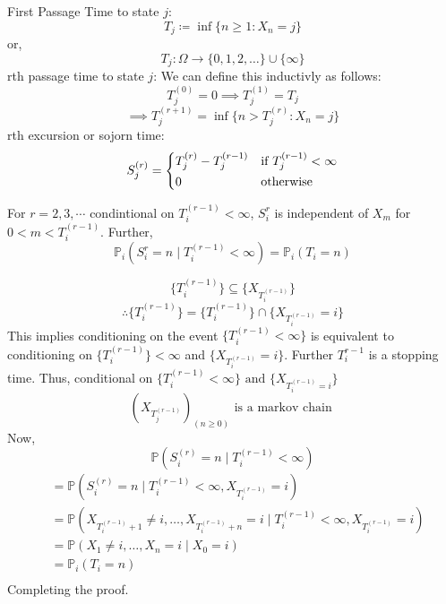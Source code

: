 \begin{definition}
    First Passage Time to state \(j\):
    \[
        T_j \coloneqq  \inf \{n \geq 1 : X_n = j\}
    \]
    or,
    \[
        T_j : \Omega \to \{0,1,2,\dots \} \cup \{\infty\}
    \]
    rth passage time to state \(j\): We can define this inductivly as follows:
    \[
        T_j^{(0)} = 0 \implies T_j^{(1)} = T_j
    \]
    \[
        \implies T_j^{(r+1)} = \inf \{n > T_j^{(r)} : X_n = j\}
    \]
    rth excursion or sojorn time:
    \[
        S_j^{(r)} = \begin{dcases}
            T_j^{(r)} - T_j^{(r-1)} & \text{if } T_j^{(r-1)} < \infty \\
            0 & \text{otherwise}
        \end{dcases}
    \]
\end{definition}
\begin{lemma} 
    For \( r = 2,3,\cdots \) condintional on \(T_i^{(r-1)} < \infty \), \(S_i^r\) is independent
    of \(X_m\) for \(0 < m < T_i^{(r-1)}\). Further,
    \[
        \mathbb{P}_i (S_i^r = n \mid T_i^{(r-1)} < \infty) = \mathbb{P}_i(T_i = n)  
    \]
\end{lemma}
\begin{lemmaproof}
    \[
        \{T_i^{(r-1)}\} \subseteq \{X_{T_i^{(r-1)}}\}
    \]
    \[
        \therefore \{T_i^{(r-1)}\} = \{T_i^{(r-1)}\} \cap \{X_{T_i^{(r-1)}} = i\}
    \]
    This implies conditioning on the event \(\{T_i ^{(r-1)} < \infty \} \) is equivalent
    to conditioning on \(\{T_i^{(r-1)}\} < \infty \) and \( \{X_{T_i^{(r-1)}} = i\} \). Further
    \(T_i^{r-1}\) is a stopping time. Thus, conditional on \(\{T_i^{(r-1)} < \infty\} \text{ and } \{
        X_{T_i^{(r-1)} = i}\} \)
    \[
        {\left( 
            X_{T_j^{(r-1)}}
         \right)}_{(n \geq 0)} \text{ is a markov chain } 
    \]
    Now,
    \[
        \mathbb{P} (
            S_i^{(r)} = n \mid T_i^{(r-1)} < \infty
            ) 
    \]
    \[
        \begin{aligned}
                &= \mathbb{P} (S_i^{(r)} = n \mid T_i^{(r-1)} < \infty, X_{T_i^{(r-1)}} = i) \\
                &= \mathbb{P} (
                    X_{T_i^{(r-1)} + 1} \neq i, \dots , X_{T_i^{(r-1)} + n} = i 
                \mid T_i^{(r-1)} < \infty, X_{T_i^{(r-1)}} = i) \\
                &= \mathbb{P} (
                    X_1 \neq i, \dots , X_n = i \mid X_0 = i
                ) \\
                &= \mathbb{P}_i (T_i = n) \\
            \end{aligned}
    \]
    Completing the proof.
\end{lemmaproof}


